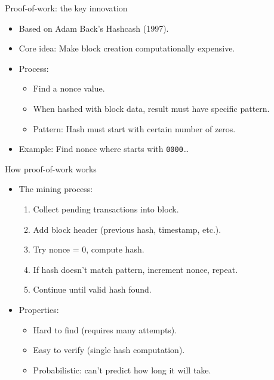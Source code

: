 \documentclass[aspectratio=169, lualatex, handout]{beamer}
\begin{document}
\begin{frame}{Proof-of-work: the key innovation}
	\begin{itemize}
		\item Based on Adam Back's Hashcash (1997).
		\item Core idea: Make block creation computationally expensive.
		\item Process:
		      \begin{itemize}
			      \item Find a nonce value.
			      \item When hashed with block data, result must have specific pattern.
			      \item Pattern: Hash must start with certain number of zeros.
		      \end{itemize}
		\item Example: Find nonce where  starts with \texttt{0000}\ldots
	\end{itemize}
\end{frame}

\begin{frame}{How proof-of-work works}
	\begin{itemize}
		\item The mining process:
		      \begin{enumerate}
			      \item Collect pending transactions into block.
			      \item Add block header (previous hash, timestamp, etc.).
			      \item Try nonce = 0, compute hash.
			      \item If hash doesn't match pattern, increment nonce, repeat.
			      \item Continue until valid hash found.
		      \end{enumerate}
		\item Properties:
		      \begin{itemize}
			      \item Hard to find (requires many attempts).
			      \item Easy to verify (single hash computation).
			      \item Probabilistic: can't predict how long it will take.
		      \end{itemize}
	\end{itemize}
\end{frame}
\end{document}

